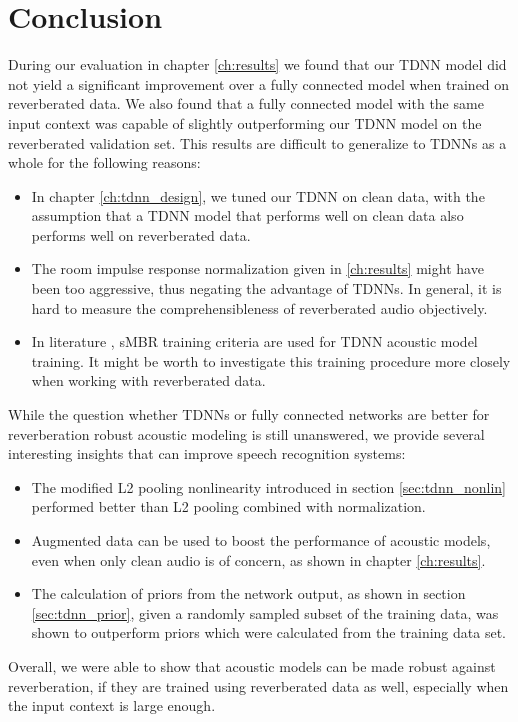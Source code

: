 
\chapter{Conclusion}
\label{ch:Conclusion}
During our evaluation in chapter \ref{ch:results} we found that our TDNN model did not yield a significant improvement over a fully connected model when trained on reverberated data. We also found that a fully connected model with the same input context was capable of slightly outperforming our TDNN model on the reverberated validation set. This results are difficult to generalize to TDNNs as a whole for the following reasons: 
\begin{itemize}
	\item In chapter \ref{ch:tdnn_design}, we tuned our TDNN on clean data, with the assumption that a TDNN model that performs well on clean data also performs well on reverberated data. 
	\item The room impulse response normalization given in \ref{ch:results} might have been too aggressive, thus negating the advantage of TDNNs. In general, it is hard to measure the comprehensibleness of reverberated audio objectively.  
	\item In literature \cite{peddinti2015jhu} \cite{peddinti2015reverberation}, sMBR training criteria are used for TDNN acoustic model training. It might be worth to investigate this training procedure more closely when working with reverberated data.  
\end{itemize}
While the question whether TDNNs or fully connected networks are better for reverberation robust acoustic modeling is still unanswered, we provide several interesting insights that can improve speech recognition systems:
\begin{itemize}
	\item The modified L2 pooling nonlinearity introduced in section \ref{sec:tdnn_nonlin} performed better than L2 pooling combined with normalization.
	\item Augmented data can be used to boost the performance of acoustic models, even when only clean audio is of concern, as shown in chapter \ref{ch:results}.
	\item The calculation of priors from the network output, as shown in section \ref{sec:tdnn_prior}, given a randomly sampled subset of the training data, was shown to outperform priors which were calculated from the training data set. 
\end{itemize}
Overall, we were able to show that acoustic models can be made robust against reverberation, if they are trained using reverberated data as well, especially when the input context is large enough. 